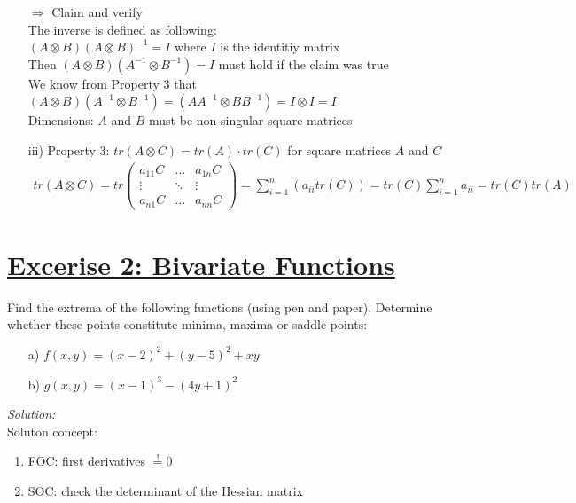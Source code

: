 \documentclass[12pt,a4paper]{article}
\newcommand{\tmpsection}[1]{}
\let\tmpsection=\section
\renewcommand{\section}[1]{\tmpsection{\underline{#1}} }
\begin{document}
\begin{itemize}
    $\Rightarrow$ Claim and verify \\
    The inverse is defined as following: \\
    $(A \otimes B)(A \otimes B)^{-1} = I$ where $I$ is the identitiy matrix\\
    Then $(A \otimes B)(A^{-1} \otimes B^{-1}) = I$ must hold if the claim was true\\
    We know from Property 3 that $(A \otimes B)(A^{-1} \otimes B^{-1}) = (AA^{-1} \otimes BB^{-1}) =  I \otimes I = I$ \\
    Dimensions: $A$ and $B$ must be non-singular square matrices
    \item[iii)] Property 3: $tr(A \otimes C ) = tr(A) \cdot tr( C)$ for square matrices $A$ and $C$
    \begin{align*}
      tr(A \otimes C) = 
      tr 
      \begin{pmatrix}
        a_{11}C & \ldots & a_{1n}C \\
        \vdots & \ddots & \vdots \\
        a_{n1}C & \ldots & a_{nn}C
      \end{pmatrix}
      = \sum_{i = 1}^{n}\left( a_{ii} tr(C) \right) = tr(C) \sum_{i=1}^{n} a_{ii} = tr(C) tr(A)
    \end{align*}
\end{itemize}

\hypertarget{excerise-2-bivariate-functions}{%
\section{Excerise 2: Bivariate
Functions}\label{excerise-2-bivariate-functions}}

Find the extrema of the following functions (using pen and paper).
Determine whether these points constitute minima, maxima or saddle
points:

\begin{itemize}
    \item[a)] $f(x,y) = (x -2)^2 + (y -5)^2 + xy$
    \item[b)] $g(x,y) = (x -1)^3 - (4y + 1)^2$
\end{itemize}

\emph{Solution:}\\
Soluton concept:

\begin{enumerate}
  \item FOC: first derivatives $\overset{!}{=} 0$
  \item SOC: check the determinant of the Hessian matrix
\end{enumerate}
\end{document}
